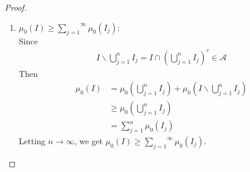 \begin{enumerate}
\begin{proof}
			\newpage
			
			\begin{enumerate}
				\item $\mu_0(I) \geq \overset{\infty}{\underset{j = 1}{\sum}}{\mu_0(I_j)}$: \\
				Since
				\begin{align}
					I \backslash \bigcup_{j = 1}^{n}{I_j} = I \cap \left( \bigcup_{j = 1}^{n}{I_j} \right)^c \in \mathcal{A}
				\end{align}
				Then
				\begin{align}
					\mu_0(I) 
					&= \mu_0(\bigcup_{j = 1}^{n}{I_j}) + \mu_0(I \backslash \bigcup_{j = 1}^{n}{I_j}) \\
					&\geq \mu_0(\bigcup_{j = 1}^{n}{I_j}) \\
					&= \sum_{j = 1}^{n}{\mu_0(I_j)}
				\end{align}
				Letting $n \to \infty$, we get $\mu_0(I) \geq \overset{\infty}{\underset{j = 1}{\sum}}{\mu_0(I_j)}$.
				
				\vspace*{6em}
				

\end{enumerate}
\end{proof}
\end{enumerate}
